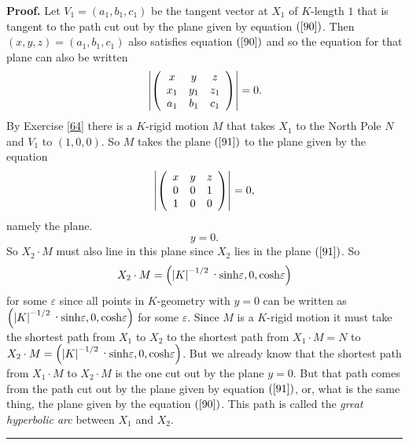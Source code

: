 \documentclass{article}%
\newenvironment{proof}[1][Proof]{\noindent\textbf{#1.} }{\ \rule{0.5em}{0.5em}}
\begin{document}
\begin{proof}
Let $V_{1}=\left(  a_{1},b_{1},c_{1}\right)  $ be the tangent vector at
$X_{1}$ of $K$-length $1$ that is tangent to the path cut out by the plane
given by equation $\left(  \ref{90}\right)  $. Then $\left(  x,y,z\right)
=\left(  a_{1},b_{1},c_{1}\right)  $ also satisfies equation $\left(
\ref{90}\right)  $ and so the equation for that plane can also be written%
\begin{equation}
\left\vert \left(
\begin{array}
[c]{ccc}%
x & y & z\\
x_{1} & y_{1} & z_{1}\\
a_{1} & b_{1} & c_{1}%
\end{array}
\right)  \right\vert =0. \label{91}%
\end{equation}
By Exercise \ref{64} there is a $K$-rigid motion $M$ that takes $X_{1}$ to the
North Pole $N$ and $V_{1}$ to $\left(  1,0,0\right)  $. So $M$ takes the plane
$\left(  \ref{91}\right)  $ to the plane given by the equation%
\[
\left\vert \left(
\begin{array}
[c]{ccc}%
x & y & z\\
0 & 0 & 1\\
1 & 0 & 0
\end{array}
\right)  \right\vert =0,
\]
namely the plane.%
\[
y=0.
\]
So $X_{2}\cdot M$ must also line in this plane since $X_{2}$ lies in the plane
$\left(  \ref{91}\right)  $. So%
\[
X_{2}\cdot M=\left(  \left\vert K\right\vert ^{-1/2}\text{\textperiodcentered
}\mathrm{sinh}\varepsilon,0,\mathrm{cosh}\varepsilon\right)
\]
for some $\varepsilon$ since all points in $K$-geometry with $y=0$ can be
written as $\left(  \left\vert K\right\vert ^{-1/2}\text{\textperiodcentered
}\mathrm{sinh}\varepsilon,0,\mathrm{cosh}\varepsilon\right)  $ for some
$\varepsilon$. Since $M$ is a $K$-rigid motion it must take the shortest path
from $X_{1}$ to $X_{2}$ to the shortest path from $X_{1}\cdot M=N$ to
$X_{2}\cdot M=\left(  \left\vert K\right\vert ^{-1/2}\text{\textperiodcentered
}\mathrm{sinh}\varepsilon,0,\mathrm{cosh}\varepsilon\right)  $. But we already
know that the shortest path from $X_{1}\cdot M$ to $X_{2}\cdot M$ is the one
cut out by the plane $y=0$. But that path comes from the path cut out by the
plane given by equation $\left(  \ref{91}\right)  $, or, what is the same
thing, the plane given by the equation $\left(  \ref{90}\right)  $. This path
is called the \textit{great hyperbolic arc} between $X_{1}$ and $X_{2}$.
\end{proof}
\end{document}
